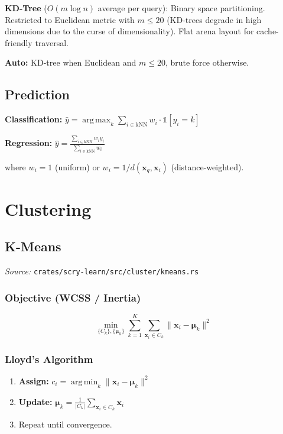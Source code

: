 \documentclass[11pt,a4paper]{article}
\theoremstyle{definition}
\theoremstyle{remark}
\DeclareMathOperator*{\argmin}{arg\,min}
\DeclareMathOperator*{\argmax}{arg\,max}
\begin{document}
\textbf{KD-Tree} ($O(m\log n)$ average per query): Binary space partitioning. Restricted to Euclidean metric with $m \leq 20$ (KD-trees degrade in high dimensions due to the curse of dimensionality). Flat arena layout for cache-friendly traversal.

\textbf{Auto:} KD-tree when Euclidean and $m \leq 20$, brute force otherwise.

\subsection{Prediction}

\textbf{Classification:} $\hat{y} = \argmax_k \sum_{i \in \text{kNN}} w_i \cdot \mathbb{1}[y_i = k]$

\textbf{Regression:} $\hat{y} = \frac{\sum_{i \in \text{kNN}} w_i y_i}{\sum_{i \in \text{kNN}} w_i}$

where $w_i = 1$ (uniform) or $w_i = 1/d(\mathbf{x}_q, \mathbf{x}_i)$ (distance-weighted).


\section{Clustering}

\subsection{K-Means}
\label{sec:kmeans}

\noindent\textit{Source:} \texttt{crates/scry-learn/src/cluster/kmeans.rs}

\subsubsection*{Objective (WCSS / Inertia)}
\begin{equation}
\min_{\{C_k\}, \{\boldsymbol{\mu}_k\}} \sum_{k=1}^K \sum_{\mathbf{x}_i \in C_k} \|\mathbf{x}_i - \boldsymbol{\mu}_k\|^2
\end{equation}

\subsubsection*{Lloyd's Algorithm}
\begin{enumerate}[label=\arabic*., itemsep=0pt]
\item \textbf{Assign:} $c_i = \argmin_k \|\mathbf{x}_i - \boldsymbol{\mu}_k\|^2$
\item \textbf{Update:} $\boldsymbol{\mu}_k = \frac{1}{|C_k|}\sum_{\mathbf{x}_i \in C_k} \mathbf{x}_i$
\item Repeat until convergence.
\end{enumerate}
\end{document}

